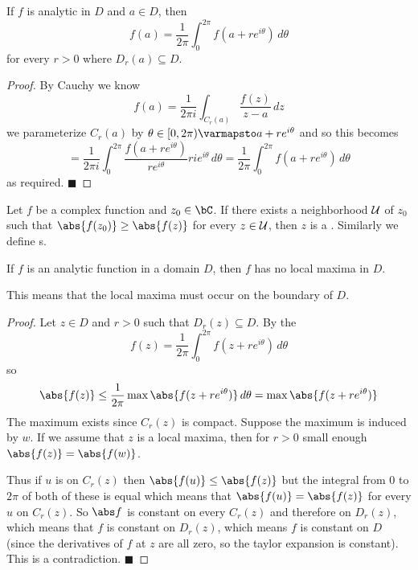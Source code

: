 \documentclass[10pt]{article}
\def\mU{{\cal U}}
\def\qed{\hskip1cm\hbox{}\hfill$\blacksquare$}
\begin{document}
\begin{thrm*}

    If $f$ is analytic in $D$ and $a\in D$, then
    \[ f(a) = \frac1{2\pi}\int_0^{2\pi} f(a+re^{i\theta})\,d\theta \]
    for every $r>0$ where $D_r(a)\subseteq D$.

\end{thrm*}

\begin{proof}

    By Cauchy we know
    \[ f(a) = \frac1{2\pi i}\int_{C_r(a)}\frac{f(z)}{z-a}\,dz \]
    we parameterize $C_r(a)$ by $\theta\in[0,2\pi)\varmapsto a+re^{i\theta}$ and so this becomes
    \[ = \frac1{2\pi i}\int_0^{2\pi}\frac{f(a+re^{i\theta})}{re^{i\theta}}rie^{i\theta}\,d\theta = \frac1{2\pi}\int_0^{2\pi} f(a+re^{i\theta})\,d\theta \]
    as required.
    \qed

\end{proof}

\begin{defn*}

    Let $f$ be a complex function and $z_0\in\bC$.
    If there exists a neighborhood $\mU$ of $z_0$ such that $\abs{f(z_0)}\geq\abs{f(z)}$ for every $z\in\mU$, then $z$ is a .
    Similarly we define s.

\end{defn*}

\begin{thrm*}

    If $f$ is an analytic function in a domain $D$, then $f$ has no local maxima in $D$.

\end{thrm*}

This means that the local maxima must occur on the boundary of $D$.

\begin{proof}

    Let $z\in D$ and $r>0$ such that $D_r(z)\subseteq D$.
    By the 
    \[ f(z) = \frac1{2\pi}\int_0^{2\pi} f(z+re^{i\theta})\,d\theta \]
    so
    \[ \abs{f(z)} \leq \frac1{2\pi} \max\abs{f(z+re^{i\theta})}\,d\theta = \max\abs{f(z+re^{i\theta})} \]
    The maximum exists since $C_r(z)$ is compact.
    Suppose the maximum is induced by $w$.
    If we assume that $z$ is a local maxima, then for $r>0$ small enough $\abs{f(z)}=\abs{f(w)}$.

    Thus if $u$ is on $C_r(z)$ then $\abs{f(u)}\leq\abs{f(z)}$ but the integral from $0$ to $2\pi$ of both of these is equal which means that $\abs{f(u)}=\abs{f(z)}$ for every $u$ on $C_r(z)$.
    So $\abs f$ is constant on every $C_r(z)$ and therefore on $D_r(z)$, which means that $f$ is constant on $D_r(z)$, which means $f$ is constant on $D$ (since the derivatives of $f$ at $z$ are all zero,
    so the taylor expansion is constant).
    This is a contradiction.
    \qed

\end{proof}
\end{document}

